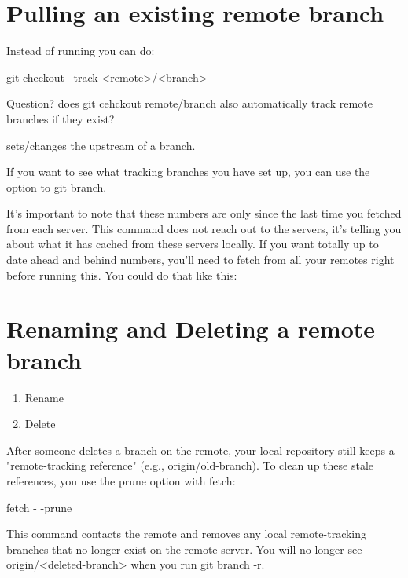 \section{Pulling an existing remote branch}
Instead of running  you can do:
\begin{gitBashBox}
git checkout --track <remote>/<branch>
\end{gitBashBox}
Question? does git cehckout remote/branch also automatically track remote branches if they exist?

 sets/changes the upstream of a branch.

If you want to see what tracking branches you have set up, you can use the  option to git branch. 


It's important to note that these numbers are only since the last time you fetched from each server. This command does not reach out to the servers, it's telling you about what it has cached from these servers locally. If you want totally up to date ahead and behind numbers, you'll need to fetch from all your remotes right before running this. You could do that like this:


\section{Renaming and Deleting a remote branch}
\begin{enumerate}
    \item Rename 
    \item Delete 
\end{enumerate}

After someone deletes a branch on the remote, your local repository still keeps a "remote-tracking reference" (e.g., origin/old-branch). To clean up these stale references, you use the prune option with fetch:
\begin{gitBashBox}
fetch - -prune    
\end{gitBashBox}
\noindent This command contacts the remote and removes any local remote-tracking branches that no longer exist on the remote server. You will no longer see origin/<deleted-branch> when you run git branch -r.